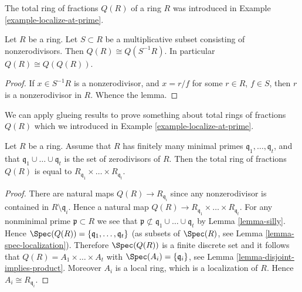 \noindent
The total ring of fractions $Q(R)$ of a ring $R$ was introduced in
Example \ref{example-localize-at-prime}.

\begin{lemma}
\label{lemma-total-ring-fractions}
Let $R$ be a ring.
Let $S \subset R$ be a multiplicative subset consisting of nonzerodivisors.
Then $Q(R) \cong Q(S^{-1}R)$.
In particular $Q(R) \cong Q(Q(R))$.
\end{lemma}

\begin{proof}
If $x \in S^{-1}R$ is a nonzerodivisor, and
$x = r/f$ for some $r \in R$, $f \in S$, then
$r$ is a nonzerodivisor in $R$. Whence the lemma.
\end{proof}

\noindent
We can apply glueing results to prove something about
total rings of fractions $Q(R)$ which we introduced in
Example \ref{example-localize-at-prime}.

\begin{lemma}
\label{lemma-total-ring-fractions-no-embedded-points}
Let $R$ be a ring.
Assume that $R$ has finitely many minimal primes
$\mathfrak q_1, \ldots, \mathfrak q_t$, and that
$\mathfrak q_1 \cup \ldots \cup \mathfrak q_t$ is the set
of zerodivisors of $R$.
Then the total ring of fractions $Q(R)$ is equal to
$R_{\mathfrak q_1} \times \ldots \times R_{\mathfrak q_t}$.
\end{lemma}

\begin{proof}
There are natural maps $Q(R) \to R_{\mathfrak q_i}$ since
any nonzerodivisor is contained in $R \setminus \mathfrak q_i$.
Hence a natural map
$Q(R) \to R_{\mathfrak q_1} \times \ldots \times R_{\mathfrak q_t}$.
For any nonminimal prime $\mathfrak p \subset R$ we see that
$\mathfrak p \not \subset \mathfrak q_1 \cup \ldots \cup \mathfrak q_t$
by Lemma \ref{lemma-silly}. Hence
$\Spec(Q(R)) = \{\mathfrak q_1, \ldots, \mathfrak q_t\}$
(as subsets of $\Spec(R)$, see Lemma \ref{lemma-spec-localization}).
Therefore $\Spec(Q(R))$ is a finite discrete set and
it follows that $Q(R) = A_1 \times \ldots \times A_t$
with $\Spec(A_i) = \{\mathfrak{q}_i\}$, see
Lemma \ref{lemma-disjoint-implies-product}.
Moreover $A_i$ is a local ring, which is a localization
of $R$. Hence $A_i \cong R_{\mathfrak q_i}$.
\end{proof}

















